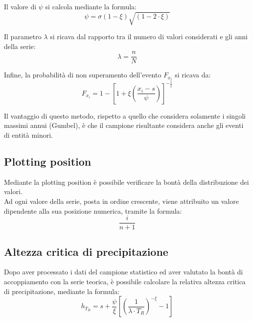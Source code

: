\noindent Il valore di $\psi$ si calcola mediante la formula:
\begin{equation}
    \psi = \sigma(1-\xi) \sqrt{(1-2 \cdot \xi)}
\end{equation}

\noindent Il parametro $\lambda$ si ricava dal rapporto tra il numero di valori considerati e gli anni della serie:
\begin{equation}
    \lambda = \frac{n}{N}
\end{equation}

\noindent Infine, la probabilità di non superamento dell'evento $F_{x_i}$ si ricava da:
\begin{equation}
F_{x_i} = 1- \left[ 1+\xi\left(\frac{x_i - s}{\psi}\right)\right]^{-\frac{1}{\xi}}
\end{equation}

\noindent Il vantaggio di questo metodo, rispetto a quello che considera solamente i singoli massimi annui (Gumbel), è che il campione risultante considera anche gli eventi di entità minori.

\subsection{Plotting position}
Mediante la plotting position è possibile verificare la bontà della distribuzione dei valori.\\
Ad ogni valore della serie, posta in ordine crescente, viene attribuito un valore dipendente alla sua posizione numerica, tramite la formula:
\begin{equation}
    \frac{i}{n+1}
\end{equation}

\subsection{Altezza critica di precipitazione}
Dopo aver processato i dati del campione statistico ed aver valutato la bontà di accoppiamento con la serie teorica, è possibile calcolare la relativa altezza critica di precipitazione, mediante la formula:
\begin{equation}
    h_{T_R} = s + \frac{\psi}{\xi} \left[ \left(\frac{1}{\lambda \cdot T_R} \right) ^{-\xi} - 1 \right]
\end{equation}

